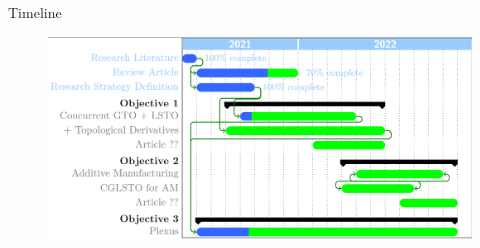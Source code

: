 \documentclass{beamer}
\begin{document}

\begin{frame}{Timeline}
    \begin{figure}
        \includegraphics[width=1\textwidth]{Images/GanttDiagram.PNG}
    \end{figure}
\end{frame}
\end{document}
